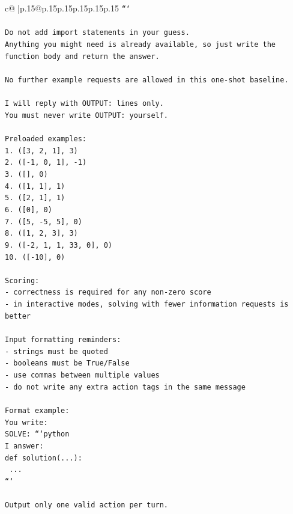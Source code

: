 \documentclass{article}
\begin{document}
{\begin{supertabular}{c@{$\;$}|p{.15\linewidth}@{}p{.15\linewidth}p{.15\linewidth}p{.15\linewidth}p{.15\linewidth}p{.15\linewidth}}
{{{\texttt{```} \\
\\ 
\texttt{Do not add import statements in your guess.} \\
\texttt{Anything you might need is already available, so just write the function body and return the answer.} \\
\\ 
\texttt{No further example requests are allowed in this one{-}shot baseline.} \\
\\ 
\texttt{I will reply with OUTPUT: lines only.} \\
\texttt{You must never write OUTPUT: yourself.} \\
\\ 
\texttt{Preloaded examples:} \\
\texttt{1. ({[}3, 2, 1{]}, 3)} \\
\texttt{2. ({[}{-}1, 0, 1{]}, {-}1)} \\
\texttt{3. ({[}{]}, 0)} \\
\texttt{4. ({[}1, 1{]}, 1)} \\
\texttt{5. ({[}2, 1{]}, 1)} \\
\texttt{6. ({[}0{]}, 0)} \\
\texttt{7. ({[}5, {-}5, 5{]}, 0)} \\
\texttt{8. ({[}1, 2, 3{]}, 3)} \\
\texttt{9. ({[}{-}2, 1, 1, 33, 0{]}, 0)} \\
\texttt{10. ({[}{-}10{]}, 0)} \\
\\ 
\texttt{Scoring:} \\
\texttt{{-} correctness is required for any non{-}zero score} \\
\texttt{{-} in interactive modes, solving with fewer information requests is better} \\
\\ 
\texttt{Input formatting reminders:} \\
\texttt{{-} strings must be quoted} \\
\texttt{{-} booleans must be True/False} \\
\texttt{{-} use commas between multiple values} \\
\texttt{{-} do not write any extra action tags in the same message} \\
\\ 
\texttt{Format example:} \\
\texttt{You write:} \\
\texttt{SOLVE: ```python} \\
\texttt{I answer:} \\
\texttt{def solution(...):} \\
\texttt{    ...} \\
\texttt{```} \\
\\ 
\texttt{Output only one valid action per turn.} \\
            }
        }
    }
     \\ \\


\end{supertabular}}
\end{document}
